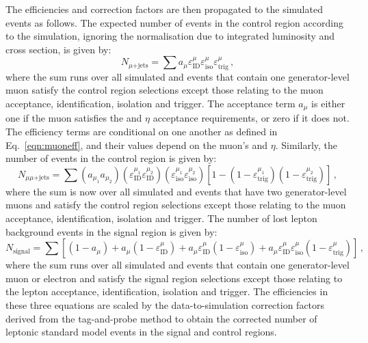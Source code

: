 The efficiencies and correction factors are then propagated to the simulated 
events as follows. The expected number of events in the \mj control region 
according to the simulation, ignoring the normalisation due to integrated 
luminosity and cross section, is given by:
\begin{equation}
N_{\mu\mathrm{+jets}} = \sum a_\mu \varepsilon_\mathrm{ID}^\mu 
\varepsilon_\mathrm{iso}^\mu \varepsilon_\mathrm{trig}^\mu \, ,
\end{equation}
where the sum runs over all simulated \wlj and \ttbar events that contain one 
generator-level muon satisfy the \mj control region 
selections except those relating to the muon acceptance, identification, 
isolation and 
trigger. The acceptance term $a_\mu$ is either one if the muon satisfies the 
\pt and $\eta$ acceptance requirements, or zero if it does not. The efficiency 
terms are conditional on one another as 
defined in Eq.~\ref{eqn:muoneff}, and their values depend on the muon's \pt and 
$\eta$. Similarly, the number of events in the \mmj control region is given by:
\begin{equation}
N_{\mu\mu\mathrm{+jets}} = \sum (a_{\mu_1} a_{\mu_2}) 
(\varepsilon_\mathrm{ID}^{\mu_1} \varepsilon_\mathrm{ID}^{\mu_2}) 
(\varepsilon_\mathrm{iso}^{\mu_1} \varepsilon_\mathrm{iso}^{\mu_2}) 
[1 - (1-\varepsilon_\mathrm{trig}^{\mu_1}) 
(1-\varepsilon_\mathrm{trig}^{\mu_2})] \, ,
\end{equation}
where the sum is now over all simulated \zmmj and \ttbar events that have two 
generator-level muons and satisfy the \mmj control region 
selections except those relating to the muon acceptance, identification, 
isolation and 
trigger. The number of lost lepton background events in the signal region is 
given by:
\begin{equation}
N_{\mathrm{signal}} = \sum \left[ (1-a_\mu) + a_\mu (1- 
\varepsilon_\mathrm{ID}^\mu) + a_\mu \varepsilon_\mathrm{ID}^\mu 
(1-\varepsilon_\mathrm{iso}^\mu) + a_\mu \varepsilon_\mathrm{ID}^\mu 
\varepsilon_\mathrm{iso}^\mu (1-\varepsilon_\mathrm{trig}^\mu) \right] \, ,
\end{equation}
where the sum runs over all simulated \wlj and \ttbar events that contain one 
generator-level muon or electron and satisfy the signal region selections 
except those relating to the lepton acceptance, identification, isolation and 
trigger. The 
efficiencies in these three equations are scaled by the data-to-simulation 
correction factors derived from the tag-and-probe method to obtain the 
corrected number of leptonic standard model events in the signal and control 
regions. 

